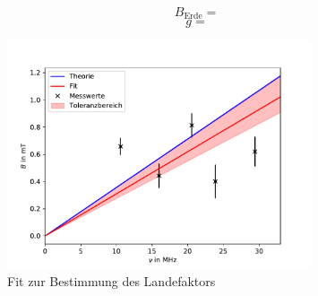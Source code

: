 \[ B_\text{Erde} =  \]
\[ g =  \]


\begin{figure}[h!]
	\centering
	\includegraphics[width=0.8\textwidth]{Fit.pdf}
	\caption{Fit zur Bestimmung des Landefaktors}
	\label{fig:fit}
\end{figure}